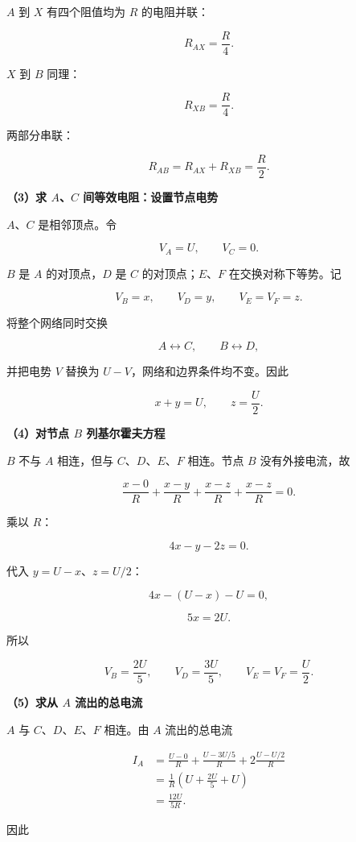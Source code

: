 \documentclass[12pt,a4paper,UTF8]{ctexart}
\begin{document}
\(A\) 到 \(X\) 有四个阻值均为 \(R\) 的电阻并联：

\[
R_{AX}=\frac R4.
\tag{1}
\]

\(X\) 到 \(B\) 同理：

\[
R_{XB}=\frac R4.
\tag{2}
\]

两部分串联：

\[
\boxed{
R_{AB}=R_{AX}+R_{XB}=\frac R2
}.
\tag{3}
\]

\textbf{（3）求 \(A\)、\(C\) 间等效电阻：设置节点电势}

\(A\)、\(C\) 是相邻顶点。令

\[
V_A=U,\qquad V_C=0.
\tag{4}
\]

\(B\) 是 \(A\) 的对顶点，\(D\) 是 \(C\) 的对顶点；\(E\)、\(F\)
在交换对称下等势。记

\[
V_B=x,\qquad V_D=y,\qquad V_E=V_F=z.
\tag{5}
\]

将整个网络同时交换

\[
A\leftrightarrow C,\qquad B\leftrightarrow D,
\]

并把电势 \(V\) 替换为 \(U-V\)，网络和边界条件均不变。因此

\[
x+y=U,
\qquad
z=\frac U2.
\tag{6}
\]

\textbf{（4）对节点 \(B\) 列基尔霍夫方程}

\(B\) 不与 \(A\) 相连，但与 \(C\)、\(D\)、\(E\)、\(F\) 相连。节点 \(B\)
没有外接电流，故

\[
\frac{x-0}{R}
+\frac{x-y}{R}
+\frac{x-z}{R}
+\frac{x-z}{R}=0.
\]

乘以 \(R\)：

\[
4x-y-2z=0.
\tag{7}
\]

代入 \(y=U-x\)、\(z=U/2\)：

\[
4x-(U-x)-U=0,
\]

\[
5x=2U.
\]

所以

\[
\boxed{
V_B=\frac{2U}{5},
\qquad
V_D=\frac{3U}{5},
\qquad
V_E=V_F=\frac U2
}.
\tag{8}
\]

\textbf{（5）求从 \(A\) 流出的总电流}

\(A\) 与 \(C\)、\(D\)、\(E\)、\(F\) 相连。由 \(A\) 流出的总电流

\[
\begin{aligned}
I_A
&=\frac{U-0}{R}
+\frac{U-3U/5}{R}
+2\frac{U-U/2}{R}\\
&=\frac1R
\left(
U+\frac{2U}{5}+U
\right)\\
&=\frac{12U}{5R}.
\end{aligned}
\tag{9}
\]

因此
\end{document}
